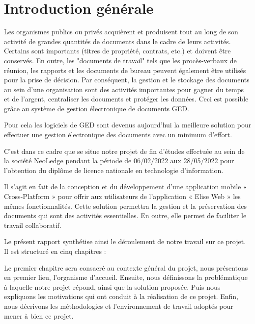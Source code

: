 \chapter*{Introduction générale}
\label{chap:introduction}

Les organismes publics ou privés acquièrent et produisent tout au long de son activité de grandes quantités de documents dans le cadre de leurs activités. Certains sont importants (titres de propriété, contrats, etc.) et doivent être conservés. En outre, les "documents de travail" tels que les procès-verbaux de réunion, les rapports et les documents de bureau peuvent également être utilisés pour la prise de décision. Par conséquent, la gestion et le stockage des documents au sein d'une organisation sont des activités importantes pour gagner du temps et de l'argent, centraliser les documents et protéger les données. Ceci est possible grâce au système de gestion électronique de documents GED. 

\medskip

Pour cela les logiciels de GED sont devenus aujourd'hui la meilleure solution pour effectuer une gestion électronique des documents avec un minimum d'effort.
\medskip

C'est dans ce cadre que se situe notre projet de fin d'études effectuée au sein de la société NeoLedge pendant la période de 06/02/2022 aux 28/05/2022 pour l'obtention du diplôme de licence nationale en technologie d'information.
\medskip

Il s'agit en fait de la conception et du développement d'une application mobile « Cross-Platform » pour offrir aux utilisateurs de l'application « Elise Web » les mêmes fonctionnalités. Cette solution permettra la gestion et la préservation des documents qui sont des activités essentielles. En outre, elle permet de faciliter le travail collaboratif.

\medskip
Le présent rapport synthétise ainsi le déroulement de notre travail sur ce projet. Il est structuré en cinq chapitres :

\medskip
 Le premier chapitre sera consacré au contexte général du projet,  nous présentons en premier lieu, l'organisme d'accueil. Ensuite, nous définissons la problématique à laquelle notre projet répond, ainsi que la solution proposée. Puis nous expliquons les motivations qui ont conduit à la réalisation de ce projet. Enfin, nous décrivons les méthodologies et l'environnement de travail adoptés pour mener à bien ce projet.

